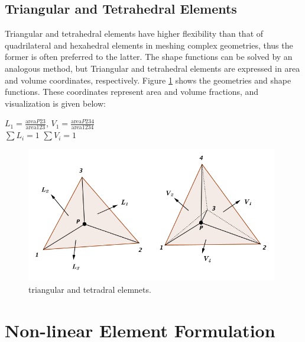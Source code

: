 \subsection{Triangular and Tetrahedral Elements}
Triangular and tetrahedral elements have higher flexibility than that of quadrilateral and hexahedral elements in meshing complex geometries, thus the former is often preferred to the latter. The shape functions can be solved by an analogous method, but Triangular and tetrahedral elements are expressed in area and volume coordinates, respectively. Figure \ref{fig: tri&tet} shows the geometries and shape functions. These coordinates represent area and volume fractions, and visualization is given below:
\begin{center}
	$L_1 = \frac{\text{area}P23}{\text{area}123}$, \quad $V_1 = \frac{\text{area}P234}{\text{area}1234}$ \\[4mm]
	$\sum L_i = 1$ \quad\quad $\sum V_i = 1$
\end{center}

\begin{figure}
	\begin{center}
		\includegraphics[width=11cm,clip]{Tri&Tet.pdf}			
		\caption{triangular and tetradral elemnets.} \label{fig: tri&tet}
	\end{center}
\end{figure}

\section{Non-linear Element Formulation}
